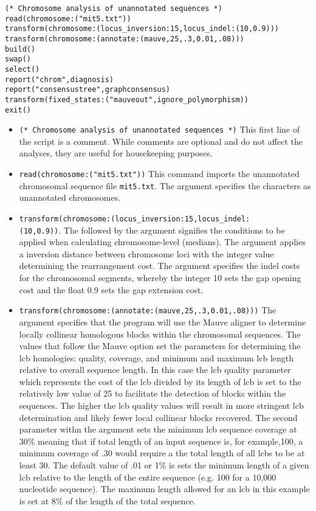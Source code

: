 \begin{verbatim}
(* Chromosome analysis of unannotated sequences *)
read(chromosome:("mit5.txt"))
transform(chromosome:(locus_inversion:15,locus_indel:(10,0.9)))
transform(chromosome:(annotate:(mauve,25,.3,0.01,.08)))
build()
swap()
select()
report("chrom",diagnosis)
report("consensustree",graphconsensus)
transform(fixed_states:("mauveout",ignore_polymorphism))
exit()
\end{verbatim}

\begin{itemize}
\item \texttt{(* Chromosome analysis of unannotated sequences *)} This first line of the script is a comment. While comments are optional and do not affect the analyses, they are useful for housekeeping purposes.
\item \texttt{read(chromosome:("mit5.txt"))} This command imports the unannotated chromosomal sequence file \texttt{mit5.txt}. The argument  specifies the characters as unannotated chromosomes.
\item \texttt{transform(chromosome:(locus\_inversion:15,locus\_indel:\\(10,0.9))}.  The  followed by the argument  signifies the conditions to be applied when calculating chromosome-level (medians).  The argument  applies a inversion distance between chromosome loci with the integer value determining the rearrangement cost. The argument  specifies the indel costs for the chromosomal segments, whereby the integer 10 sets the gap opening cost and the float 0.9 sets the gap extension cost.
\item \texttt{transform(chromosome:(annotate:(mauve,25,.3,0.01,.08)))} The argument  specifies that the program will use the Mauve aligner \cite{darlingetal2004} to determine locally collinear homologous blocks within the chromosomal sequences.  The values that follow the Mauve option set the parameters for determining the lcb homologies: quality, coverage, and minimum and maximum lcb length relative to overall sequence length. In this case the lcb quality parameter which represents the cost of the lcb divided by its length of lcb is set to the relatively low value of 25 to facilitate the detection of blocks within the sequences.  The higher the lcb quality values will result in more stringent lcb determination and likely fewer local collinear blocks recovered.  The second parameter withn the argument  sets the minimum lcb sequence coverage at 30\% meaning that if total length of an input sequence is, for example,100, a minimum coverage of .30 would require a the total length of all lcbs to be at least 30. The default value of .01 or 1\% is sets the minimum length of a given lcb relative to the length of the entire sequence (e.g. 100 for a 10,000 nucleotide sequence). The maximum length allowed for an lcb in this example is set at 8\% of the length of the total sequence.

\end{itemize}
